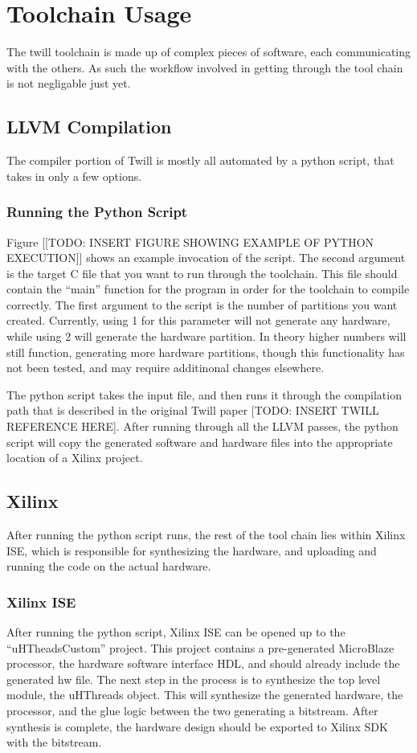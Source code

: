 \chapter{Toolchain Usage \label{chap:ToolChain}}
The twill toolchain is made up of complex pieces of software, each communicating with the others. As such the workflow involved in getting through the tool chain is not negligable just yet. 

\section{LLVM Compilation}
The compiler portion of Twill is mostly all automated by a python script, that takes in only a few options. 

\subsection{Running the Python Script}
Figure [[TODO: INSERT FIGURE SHOWING EXAMPLE OF PYTHON EXECUTION]] shows an example invocation of the script. The second argument is the target C file that you want to run through the toolchain. This file should contain the ``main'' function for the program in order for the toolchain to compile correctly. The first argument to the script is the number of partitions you want created. Currently, using 1 for this parameter will not generate any hardware, while using 2 will generate the hardware partition. In theory higher numbers will still function, generating more hardware partitions, though this functionality has not been tested, and may require additinonal changes elsewhere.

The python script takes the input file, and then runs it through the compilation path that is described in the original Twill paper [TODO: INSERT TWILL REFERENCE HERE]. After running through all the LLVM passes, the python script will copy the generated software and hardware files into the appropriate location of a Xilinx project. 

\section{Xilinx}
After running the python script runs, the rest of the tool chain lies within Xilinx ISE, which is responsible for synthesizing the hardware, and uploading and running the code on the actual hardware.

\subsection{Xilinx ISE}
After running the python script, Xilinx ISE can be opened up to the ``uHTheadsCustom'' project. This project contains a pre-generated MicroBlaze processor, the hardware software interface HDL, and should already include the generated hw file. The next step in the process is to synthesize the top level module, the uHThreads object. This will synthesize the generated hardware, the processor, and the glue logic between the two generating a bitstream. After synthesis is complete, the hardware design should be exported to Xilinx SDK with the bitstream.

